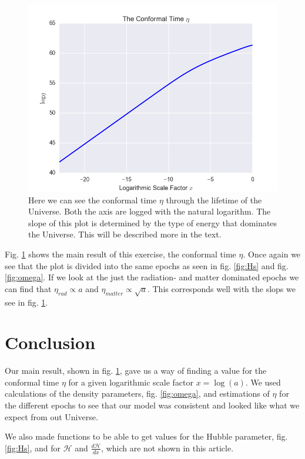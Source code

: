 \documentclass[a4paper,norsk, 10pt]{article}
\begin{document}
\begin{figure}[H]
     \centering
	{\includegraphics[scale=0.5]{eta.png}
	\caption{Here we can see the conformal time $\eta$ through the lifetime of the Universe. Both the axis are logged with the natural logarithm. The slope of this plot is determined by the type of energy that dominates the Universe. This will be described more in the text. }\label{fig:eta}}
\end{figure}

Fig. \ref{fig:eta} shows the main result of this exercise, the conformal time $\eta$. Once again we see that the plot is divided into the same epochs as seen in fig. \ref{fig:Hs} and fig. \ref{fig:omega}. If we look at the just the radiation- and matter dominated epochs we can find that $\eta_{rad} \propto a$ and $\eta_{matter}\propto \sqrt{a}$. This corresponds well with the slops we see in fig. \ref{fig:eta}.


\section{Conclusion}

Our main result, shown in fig. \ref{fig:eta}, gave us a way of finding a value for the conformal time $\eta$ for a given logarithmic scale factor $x = \log(a)$. We used calculations of the density parameters, fig. \ref{fig:omega}, and estimations of $\eta$ for the different epochs to see that our model was consistent and looked like what we expect from out Universe. 

We also made functions to be able to get values for the Hubble parameter, fig. \ref{fig:Hs}, and for $\mathcal{H}$ and $\frac{d\mathcal{H}}{dx}$, which are not shown in this article.
\end{document}

